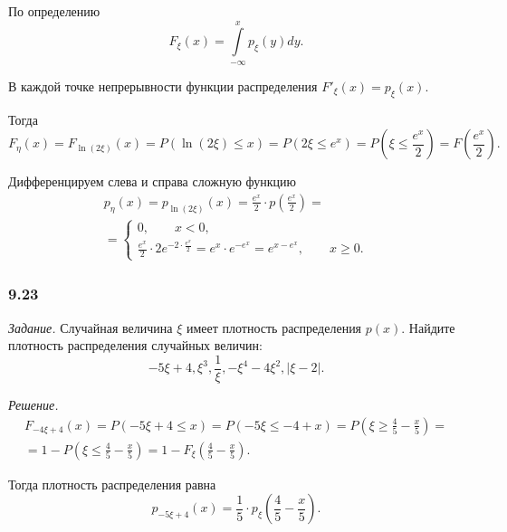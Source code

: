 По определению
$$F_{ \xi } \left( x \right) =
\int \limits_{- \infty }^x p_{ \xi } \left( y \right) dy.$$

В каждой точке непрерывности функции распределения $F'_{ \xi } \left( x \right) = p_{ \xi } \left( x \right) $.

Тогда
$$F_{ \eta } \left( x \right) =
F_{ \ln \left( 2 \xi \right) } \left( x \right) =
P \left( \ln \left( 2 \xi \right) \leq x \right) =
P \left( 2 \xi \leq e^x \right) =
P \left( \xi \leq \frac{e^x}{2} \right) =
F \left( \frac{e^x}{2} \right).$$

Дифференцируем слева и справа сложную функцию
\begin{equation*}
\begin{split}
p_{ \eta } \left( x \right) =
p_{ \ln \left( 2 \xi \right) } \left( x \right) =
\frac{e^x}{2} \cdot p \left( \frac{e^x}{2} \right) = \\
= \begin{cases}
0, \qquad x < 0, \\
\frac{e^x}{2} \cdot 2e^{-2 \cdot \frac{e^x}{2}} =
e^x \cdot e^{-e^x} =
e^{x-e^x}, \qquad x \geq 0.
\end{cases}
\end{split}
\end{equation*}

\subsubsection*{9.23}

\textit{Задание.} Случайная величина $ \xi $ имеет плотность распределения $p \left( x \right) $.
Найдите плотность распределения случайных величин:
$$-5 \xi + 4,
\xi^3,
\frac{1}{ \xi },
- \xi^4 - 4 \xi^2,
\left| \xi - 2 \right|.$$

\textit{Решение.}
\begin{equation*}
\begin{split}
F_{-4 \xi + 4} \left( x \right) =
P \left( -5 \xi+4 \leq x \right) =
P \left( -5 \xi \leq -4 + x \right) =
P \left( \xi \geq \frac{4}{5} - \frac{x}{5} \right) = \\
= 1 - P \left( \xi \leq \frac{4}{5} - \frac{x}{5} \right) =
1 - F_{ \xi } \left( \frac{4}{5} - \frac{x}{5} \right).
\end{split}
\end{equation*}

Тогда плотность распределения равна
$$p_{-5 \xi + 4} \left( x \right) =
\frac{1}{5} \cdot p_{ \xi } \left( \frac{4}{5} - \frac{x}{5} \right).$$


